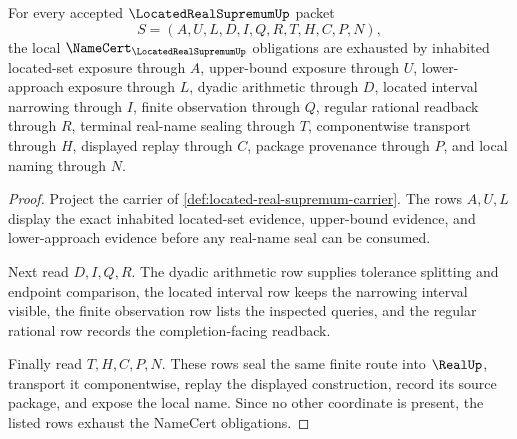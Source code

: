 \begin{theorem}
\label{thm:located-real-supremum-namecert-obligations}
For every accepted $\LocatedRealSupremumUp$ packet
$$
S=(A,U,L,D,I,Q,R,T,H,C,P,N),
$$
the local $\NameCert_{\LocatedRealSupremumUp}$ obligations are exhausted by inhabited located-set exposure through $A$, upper-bound exposure through $U$, lower-approach exposure through $L$, dyadic arithmetic through $D$, located interval narrowing through $I$, finite observation through $Q$, regular rational readback through $R$, terminal real-name sealing through $T$, componentwise transport through $H$, displayed replay through $C$, package provenance through $P$, and local naming through $N$.
\end{theorem}
\begin{proof}
Project the carrier of \autoref{def:located-real-supremum-carrier}. The rows $A,U,L$ display the exact inhabited located-set evidence, upper-bound evidence, and lower-approach evidence before any real-name seal can be consumed.

Next read $D,I,Q,R$. The dyadic arithmetic row supplies tolerance splitting and endpoint comparison, the located interval row keeps the narrowing interval visible, the finite observation row lists the inspected queries, and the regular rational row records the completion-facing readback.

Finally read $T,H,C,P,N$. These rows seal the same finite route into $\RealUp$, transport it componentwise, replay the displayed construction, record its source package, and expose the local name. Since no other coordinate is present, the listed rows exhaust the NameCert obligations.
\end{proof}

